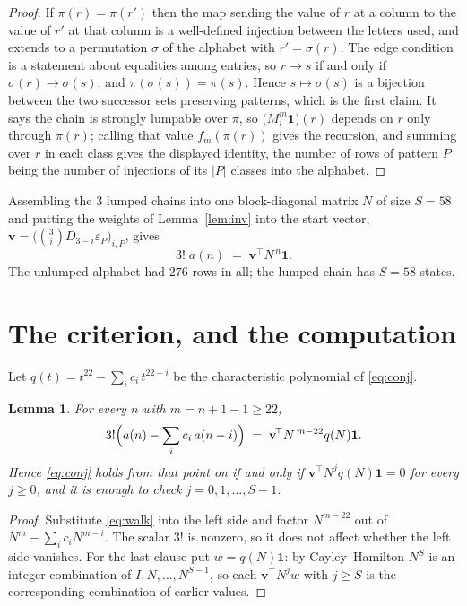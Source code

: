 \documentclass[11pt,a4paper]{article}
\theoremstyle{plain}
\newtheorem{lemma}[theorem]{Lemma}
\theoremstyle{definition}
\begin{document}
\begin{proof}
If $\pi(r)=\pi(r')$ then the map sending the value of $r$ at a column to the value of $r'$
at that column is a well-defined injection between the letters used, and extends to a
permutation $\sigma$ of the alphabet with $r'=\sigma(r)$. The edge condition is a statement
about equalities among entries, so $r\to s$ if and only if $\sigma(r)\to\sigma(s)$; and
$\pi(\sigma(s))=\pi(s)$. Hence $s\mapsto\sigma(s)$ is a bijection between the two successor
sets preserving patterns, which is the first claim. It says the chain is strongly lumpable
over $\pi$, so $\bigl(M_i^{m}\mathbf{1}\bigr)(r)$ depends on $r$ only through $\pi(r)$;
calling that value $f_m(\pi(r))$ gives the recursion, and summing over $r$ in each class
gives the displayed identity, the number of rows of pattern $P$ being the number of
injections of its $|P|$ classes into the alphabet.
\end{proof}

Assembling the $3$ lumped chains into one block-diagonal matrix $N$ of size $S=58$ and
putting the weights of Lemma~\ref{lem:inv} into the start vector,
$\mathbf{v}=\bigl(\binom{3}{i}D_{3-i}\varepsilon_P\bigr)_{i,P}$, gives
\begin{equation}\label{eq:walk}
3!\;a(n)\;=\;\mathbf{v}^{\!\top}N^{\,n}\mathbf{1} .
\end{equation}
The unlumped alphabet had $276$ rows in all; the lumped chain has $S=58$ states.

\section{The criterion, and the computation}

Let $q(t)=t^{22}-\sum_i c_i\,t^{22-i}$ be the characteristic polynomial of
\eqref{eq:conj}.

\begin{lemma}\label{lem:crit}
For every $n$ with $m=n+1-1\ge22$,
\[
3!\Bigl(a(n)-\sum_i c_i\,a(n-i)\Bigr)\;=\;\mathbf{v}^{\!\top}N^{\,m-22}q(N)\mathbf{1} .
\]
Hence \eqref{eq:conj} holds from that point on if and only if
$\mathbf{v}^{\!\top}N^{j}q(N)\mathbf{1}=0$ for every $j\ge0$, and it is enough to check
$j=0,1,\dots,S-1$.
\end{lemma}

\begin{proof}
Substitute \eqref{eq:walk} into the left side and factor $N^{m-22}$ out of
$N^{m}-\sum_i c_iN^{m-i}$. The scalar $3!$ is nonzero, so it does not affect whether
the left side vanishes. For the last clause put $w=q(N)\mathbf{1}$: by Cayley--Hamilton
$N^{S}$ is an integer combination of $I,N,\dots,N^{S-1}$, so each
$\mathbf{v}^{\!\top}N^{j}w$ with $j\ge S$ is the corresponding combination of earlier
values.
\end{proof}
\end{document}
